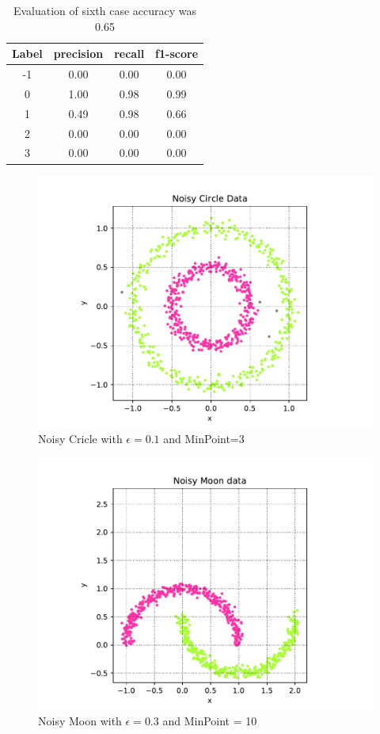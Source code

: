 \begin{table}[]
	\centering
	\caption{Evaluation of sixth case accuracy was 0.65}
	\label{tab:6}
	\begin{tabular}{cccc}
		\textbf{Label} & \textbf{precision} & \textbf{recall} & \textbf{f1-score} \\
		\hline
          -1    &   0.00   &   0.00    &  0.00     \\
			0    &   1.00   &   0.98    &  0.99     \\
			1    &   0.49   &   0.98    &  0.66     \\
			2    &   0.00   &   0.00    &  0.00     \\
			3    &   0.00   &   0.00    &  0.00     \\
	\end{tabular}
\end{table}


\begin{figure}[h]
	\centering
	\includegraphics[width=1\linewidth]{figures/NoisyCircleTune}
	\caption{Noisy Cricle with $\epsilon = 0.1$ and MinPoint=3}
	\label{fig:noisycircletune}
\end{figure}

\begin{figure}[h]
	\centering
	\includegraphics[width=1\linewidth]{figures/NoisyMoonTune}
	\caption{Noisy Moon with  $\epsilon = 0.3$ and MinPoint = 10}
	\label{fig:noisymoontune}
\end{figure}
